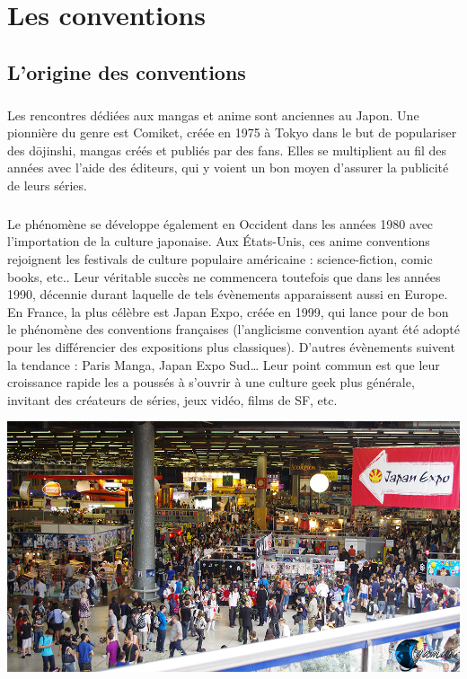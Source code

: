 \chapter{Les conventions}
\section{L'origine des conventions}
\paragraph{}
Les rencontres dédiées aux mangas et anime sont anciennes au Japon. Une pionnière du genre est Comiket, créée en 1975 à Tokyo dans le but de populariser des d\=ojinshi, mangas créés et publiés par des fans. Elles se multiplient au fil des années avec l’aide des éditeurs, qui y voient un bon moyen d’assurer la publicité de leurs séries.
\paragraph{}
Le phénomène se développe également en Occident dans les années 1980 avec l’importation de la culture japonaise. Aux États-Unis, ces anime conventions rejoignent les festivals de culture populaire américaine : science-fiction, comic books, etc.. Leur véritable succès ne commencera toutefois que dans les années 1990, décennie durant laquelle de tels évènements apparaissent aussi en Europe. En France, la plus célèbre est Japan Expo, créée en 1999, qui lance pour de bon le phénomène des conventions françaises (l’anglicisme convention ayant été adopté pour les différencier des expositions plus classiques). D’autres évènements suivent la tendance : Paris Manga, Japan Expo Sud… Leur point commun est que leur croissance rapide les a poussés à s’ouvrir à une culture geek plus générale, invitant des créateurs de séries, jeux vidéo, films de SF, etc.
\begin{center}
\includegraphics[scale=0.3]{japanexpo.jpg}
\end{center}

